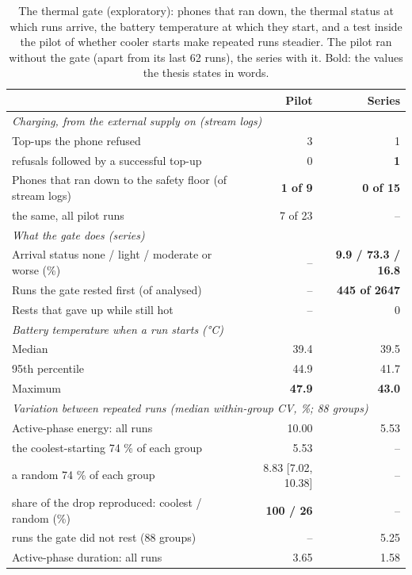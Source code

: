 \begin{table}[t]
\centering
\small
\caption{The thermal gate (exploratory): phones that ran down, the thermal status at which runs arrive, the battery temperature at which they start, and a test inside the pilot of whether cooler starts make repeated runs steadier. The pilot ran without the gate (apart from its last 62 runs), the series with it. Bold: the values the thesis states in words.}
\label{tab:thermal-gate}
\begin{tabular}{lrr}
\toprule
\textbf{} & \textbf{Pilot} & \textbf{Series} \\
\midrule
\multicolumn{3}{l}{\textit{Charging, from the external supply on (stream logs)}} \\
Top-ups the phone refused & 3 & 1 \\
refusals followed by a successful top-up & 0 & \textbf{1} \\
Phones that ran down to the safety floor (of stream logs) & \textbf{1 of 9} & \textbf{0 of 15} \\
the same, all pilot runs & 7 of 23 & – \\
\midrule
\multicolumn{3}{l}{\textit{What the gate does (series)}} \\
Arrival status none / light / moderate or worse (\%) & – & \textbf{9.9 / 73.3 / 16.8} \\
Runs the gate rested first (of analysed) & – & \textbf{445 of 2647} \\
Rests that gave up while still hot & – & 0 \\
\midrule
\multicolumn{3}{l}{\textit{Battery temperature when a run starts (°C)}} \\
Median & 39.4 & 39.5 \\
95th percentile & 44.9 & 41.7 \\
Maximum & \textbf{47.9} & \textbf{43.0} \\
\midrule
\multicolumn{3}{l}{\textit{Variation between repeated runs (median within-group CV, \%; 88 groups)}} \\
Active-phase energy: all runs & 10.00 & 5.53 \\
the coolest-starting 74 \% of each group & 5.53 & – \\
a random 74 \% of each group & 8.83 [7.02, 10.38] & – \\
share of the drop reproduced: coolest / random (\%) & \textbf{100 / 26} & – \\
runs the gate did not rest (88 groups) & – & 5.25 \\
Active-phase duration: all runs & 3.65 & 1.58 \\

\end{tabular}
\end{table}
